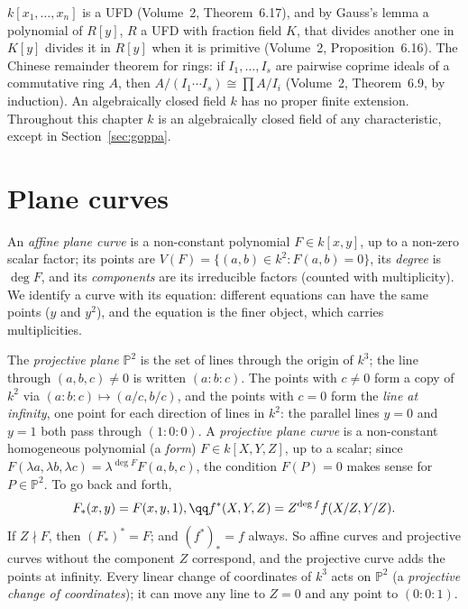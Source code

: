 \begin{reminder}
$k[x_1,\dots,x_n]$ is a UFD (Volume~2, Theorem~6.17), and by Gauss's lemma a polynomial of $R[y]$, $R$ a UFD with fraction field $K$, that
divides another one in $K[y]$ divides it in $R[y]$ when it is primitive (Volume~2, Proposition~6.16). The Chinese remainder theorem for rings:
if $I_1,\dots,I_s$ are pairwise coprime ideals of a commutative ring $A$, then $A/(I_1\cdots I_s)\cong\prod A/I_i$ (Volume~2, Theorem~6.9, by
induction). An algebraically closed field $k$ has no proper finite extension. Throughout this chapter $k$ is an algebraically closed
field of any characteristic, except in Section~\ref{sec:goppa}.
\end{reminder}

\section{Plane curves}

An \emph{affine plane curve} is a non-constant polynomial $F\in k[x,y]$, up to a non-zero scalar factor; its points are
$V(F)=\{(a,b)\in k^2:F(a,b)=0\}$, its \emph{degree} is $\deg F$, and its \emph{components} are its irreducible factors (counted with
multiplicity). We identify a curve with its equation: different equations can have the same points ($y$ and $y^2$), and the equation is the
finer object, which carries multiplicities.

The \emph{projective plane} $\mathbb P^2$ is the set of lines through the origin of $k^3$; the line through $(a,b,c)\ne0$ is written
$(a:b:c)$. The points with $c\ne0$ form a copy of $k^2$ via $(a:b:c)\mapsto(a/c,b/c)$, and the points with $c=0$ form the \emph{line at
infinity}, one point for each direction of lines in $k^2$: the parallel lines $y=0$ and $y=1$ both pass through $(1:0:0)$. A
\emph{projective plane curve} is a non-constant homogeneous polynomial (a \emph{form}) $F\in k[X,Y,Z]$, up to a scalar; since
$F(\lambda a,\lambda b,\lambda c)=\lambda^{\deg F}F(a,b,c)$, the condition $F(P)=0$ makes sense for $P\in\mathbb P^2$. To go back and forth,
\[
F_*(x,y)=F(x,y,1),\qq f^*(X,Y,Z)=Z^{\deg f}f(X/Z,Y/Z).
\]
If $Z\nmid F$, then $(F_*)^*=F$; and $(f^*)_*=f$ always. So affine curves and projective curves without the component $Z$ correspond, and the
projective curve adds the points at infinity. Every linear change of coordinates of $k^3$ acts on $\mathbb P^2$ (a \emph{projective change of
coordinates}); it can move any line to $Z=0$ and any point to $(0:0:1)$.

